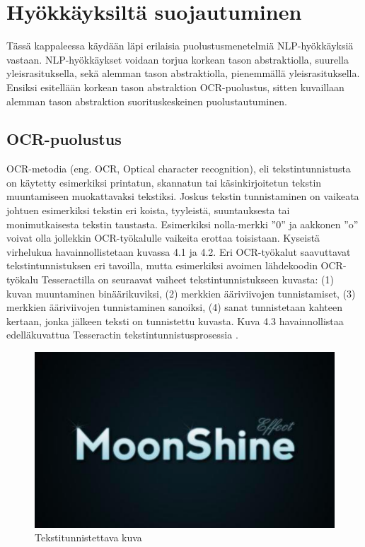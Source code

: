 \chapter{Hyökkäyksiltä suojautuminen\label{discussion}}

Tässä kappaleessa käydään läpi erilaisia puolustusmenetelmiä NLP-hyökkäyksiä vastaan. NLP-hyökkäykset voidaan torjua korkean tason abstraktiolla, suurella yleisrasituksella, sekä alemman tason abstraktiolla, pienemmällä yleisrasituksella. Ensiksi esitellään korkean tason abstraktion OCR-puolustus, sitten kuvaillaan alemman tason abstraktion suorituskeskeinen puolustautuminen.

\section{OCR-puolustus}
OCR-metodia (eng. OCR, Optical character recognition), eli tekstintunnistusta on käytetty esimerkiksi printatun, skannatun tai käsinkirjoitetun tekstin muuntamiseen muokattavaksi tekstiksi. Joskus tekstin tunnistaminen on vaikeata johtuen esimerkiksi tekstin eri koista, tyyleistä, suuntauksesta tai monimutkaisesta tekstin taustasta. Esimerkiksi nolla-merkki ''0'' ja aakkonen ''o'' voivat olla jollekkin OCR-työkalulle vaikeita erottaa toisistaan. Kyseistä virhelukua havainnollistetaan kuvassa 4.1 ja 4.2. Eri OCR-työkalut saavuttavat tekstintunnistuksen eri tavoilla, mutta esimerkiksi avoimen lähdekoodin OCR-työkalu Tesseractilla on seuraavat vaiheet tekstintunnistukseen kuvasta: (1) kuvan muuntaminen binäärikuviksi, (2) merkkien ääriviivojen tunnistamiset, (3) merkkien ääriviivojen tunnistaminen sanoiksi, (4) sanat tunnistetaan kahteen kertaan, jonka jälkeen teksti on tunnistettu kuvasta. Kuva 4.3 havainnollistaa edelläkuvattua Tesseractin tekstintunnistusprosessia \citep{tesseractocr}.

\begin{figure}[t]
  \includegraphics[scale=0.6]{figures/moonshine.png}
  \caption{Tekstitunnistettava kuva \citep{tesseractocr}}
\end{figure}

